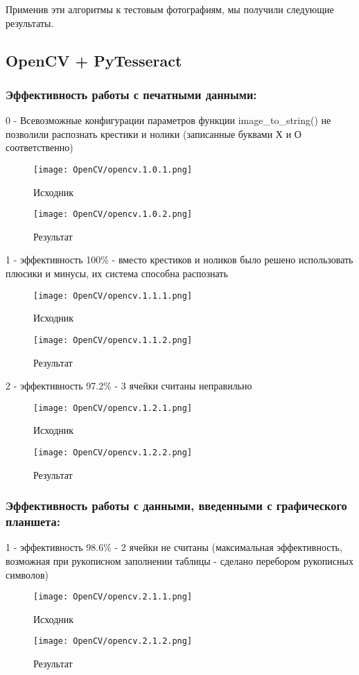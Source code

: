 \documentclass[a4paper, 12pt]{report}
\begin{document}
Применив эти алгоритмы к тестовым фотографиям, мы получили следующие результаты.

\subsection{OpenCV + PyTesseract}

\subsubsection{Эффективность работы с печатными данными:}
0 - Всевозможные конфигурации параметров функции image\_to\_string() не позволили распознать крестики и нолики (записанные буквами Х и О соответственно)
\begin{figure}[ht]
    \centering
    \texttt{[image: OpenCV/opencv.1.0.1.png]}
    \caption{Исходник}
    \label{fig:my_label}
\end{figure}
\begin{figure}[ht]
    \centering
    \texttt{[image: OpenCV/opencv.1.0.2.png]}
    \caption{Результат}
    \label{fig:my_label}
\end{figure}
\pagebreak

1 - эффективность 100\% - вместо крестиков и ноликов было решено использовать плюсики и минусы, их система способна распознать
\begin{figure}[ht]
    \centering
    \texttt{[image: OpenCV/opencv.1.1.1.png]}
    \caption{Исходник}
    \label{fig:my_label}
\end{figure}
\begin{figure}[ht]
    \centering
    \texttt{[image: OpenCV/opencv.1.1.2.png]}
    \caption{Результат}
    \label{fig:my_label}
\end{figure}
\pagebreak

2 - эффективность 97.2\% - 3 ячейки считаны неправильно
\begin{figure}[ht]
    \centering
    \texttt{[image: OpenCV/opencv.1.2.1.png]}
    \caption{Исходник}
    \label{fig:my_label}
\end{figure}
\begin{figure}[ht]
    \centering
    \texttt{[image: OpenCV/opencv.1.2.2.png]}
    \caption{Результат}
    \label{fig:my_label}
\end{figure}
\pagebreak

\subsubsection{Эффективность работы с данными, введенными с графического планшета:}
1 - эффективность 98.6\% - 2 ячейки не считаны (максимальная эффективность, возможная при рукописном заполнении таблицы - сделано перебором рукописных символов)
\begin{figure}[ht]
    \centering
    \texttt{[image: OpenCV/opencv.2.1.1.png]}
    \caption{Исходник}
    \label{fig:my_label}
\end{figure}
\begin{figure}[ht]
    \centering
    \texttt{[image: OpenCV/opencv.2.1.2.png]}
    \caption{Результат}
    \label{fig:my_label}
\end{figure}
\pagebreak
\end{document}
